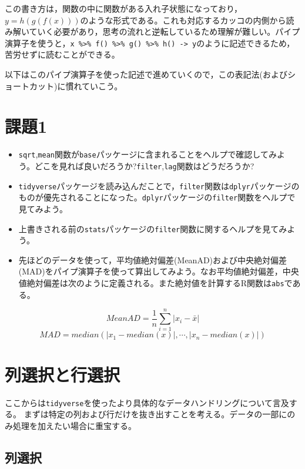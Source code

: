 \documentclass[
  a4paper,
]{ltjsbook}
\providecommand{\tightlist}{%
  \setlength{\itemsep}{0pt}\setlength{\parskip}{0pt}}\usepackage{longtable,booktabs,array}
\begin{document}
この書き方は，関数の中に関数がある入れ子状態になっており，\(y = h(g(f(x)))\)のような形式である。これも対応するカッコの内側から読み解いていく必要があり，思考の流れと逆転しているため理解が難しい。パイプ演算子を使うと，\texttt{x\ \%\textgreater{}\%\ f()\ \%\textgreater{}\%\ g()\ \%\textgreater{}\%\ h()\ -\textgreater{}\ y}のように記述できるため，苦労せずに読むことができる。

以下はこのパイプ演算子を使った記述で進めていくので，この表記法(およびショートカット)に慣れていこう。

\section{課題1}\label{ux8ab2ux984c1}

\begin{itemize}
\tightlist
\item
  \texttt{sqrt},\texttt{mean}関数が\texttt{base}パッケージに含まれることをヘルプで確認してみよう。どこを見れば良いだろうか?\texttt{filter},\texttt{lag}関数はどうだろうか?
\item
  \texttt{tidyverse}パッケージを読み込んだことで，\texttt{filter}関数は\texttt{dplyr}パッケージのものが優先されることになった。\texttt{dplyr}パッケージの\texttt{filter}関数をヘルプで見てみよう。
\item
  上書きされる前の\texttt{stats}パッケージの\texttt{filter}関数に関するヘルプを見てみよう。
\item
  先ほどのデータを使って，平均値絶対偏差(MeanAD)および中央絶対偏差(MAD)をパイプ演算子を使って算出してみよう。なお平均値絶対偏差，中央値絶対偏差は次のように定義される。また絶対値を計算するR関数は\texttt{abs}である。
\end{itemize}

\[MeanAD = \frac{1}{n}\sum_{i=1}^n|x_i - \bar{x}|\]
\[MAD = median(|x_1-median(x)|,\cdots,|x_n-median(x)|)\]

\section{列選択と行選択}\label{ux5217ux9078ux629eux3068ux884cux9078ux629e}

ここからは\texttt{tidyverse}を使ったより具体的なデータハンドリングについて言及する。
まずは特定の列および行だけを抜き出すことを考える。データの一部にのみ処理を加えたい場合に重宝する。

\subsection{列選択}\label{ux5217ux9078ux629e}
\end{document}
